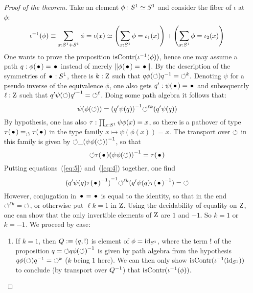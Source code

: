 \documentclass[english,a4]{article}
\def\blank{\_}%
\begin{document}
\begin{proof}[Proof of the theorem]
  Take an element $\phi : {S^1} \simeq {S^1}$ and consider the fiber of
  $\iota$ at $\phi$:
  \begin{equation}
    \label{eq:fiber-iota-two-components}%
    \inv\iota(\phi) \jdeq \sum_{x:\Sc+\Sc} \phi = \iota(x)
    \weq \left(\sum_{x:\Sc}\phi = \iota_1(x)\right) +
    \left(\sum_{x:\Sc}\phi = \iota_2(x)\right)
  \end{equation}
  One wants to prove the proposition $\mathrm{isContr}({\iota}^{-1}(\phi))$,
  hence one may assume a path $q:\phi(\base) = \base$ instead of
  merely $\Trunc{\phi(\base) = \base}$. By the description of the
  symmetries of $\base:\Sc$, there is $k:\mathrm{Z}$ such that
  $q\phi(\mathord{\circlearrowleft}){q}^{-1} = \mathord{\circlearrowleft}^k$. Denoting $\psi$ for a pseudo
  inverse of the equivalence $\phi$, one also gets
  $q':\psi(\base) = \base$ and subsequently $\ell:\mathrm{Z}$ such that
  $q'\psi(\mathord{\circlearrowleft}){q'}^{-1} = \mathord{\circlearrowleft}^\ell$. Doing some path algebra it
  follows that:
  \begin{equation}
    \label{eq:4}
    \psi(\phi(\mathord{\circlearrowleft})) = {(q' \psi(q))}^{-1}\mathord{\circlearrowleft}^{\ell k} (q' \psi(q))
  \end{equation}
  By hypothesis, one has also $\tau : \prod_{x:{S^1}}\psi\phi(x) = x$,
  so there is a pathover of type
  $\pathover {\tau(\base)} {} \Sloop {\tau(\base)}$ in the type family
  $x \mapsto \psi(\phi(x)) = x$. The transport over $\mathord{\circlearrowleft}$ in this
  family is given by $\Sloop \blank \inv{(\psi\phi(\Sloop))}$, so that
  \begin{equation}
    \label{eq:5}
    \Sloop \tau(\base) \inv{(\psi\phi(\Sloop))} = \tau(\base)
  \end{equation}
  Putting equations~(\ref{eq:5}) and~(\ref{eq:4}) together, one find
  \begin{equation}
    \label{eq:6}
    \inv{(q' \psi(q) \inv{\tau(\base)})} \Sloop^{\ell k} (q' \psi(q) \inv{\tau(\base)}) = \Sloop
  \end{equation}
  However, conjugation in $\base = \base$ is equal to the identity, so
  that in the end $\mathord{\circlearrowleft}^{\ell k} = \mathord{\circlearrowleft}$, or otherwise put
  $\ell k = 1$ in $\mathrm{Z}$. Using the decidability of equality on
  $\mathrm{Z}$, one can show that the only invertible elements of $\mathrm{Z}$ are
  $1$ and $-1$. So $k = 1$ or $k = -1$. We proceed by case:
  \begin{enumerate}
  \item If $k=1$, then $Q \mathrel{\hbox{:}\mkern-5mu\equiv} (q, !)$ is element of
    $\phi = \mathord{\mathrm{id}}_{S^1}$, where the term $!$ of the proposition
    $q=\mathord{\circlearrowleft} q {\phi(\mathord{\circlearrowleft})}^{-1}$ is given by path algebra from the
    hypothesis $q\phi(\mathord{\circlearrowleft}){q}^{-1}=\mathord{\circlearrowleft}^k$ ($k$ being $1$ here). We
    can then only show $\mathrm{isContr}({\iota}^{-1}(\mathord{\mathrm{id}}_{S^1}))$ to conclude (by
    transport over ${Q}^{-1}$) that $\mathrm{isContr}({\iota}^{-1}(\phi))$. 


\end{enumerate}
\end{proof}
\end{document}

